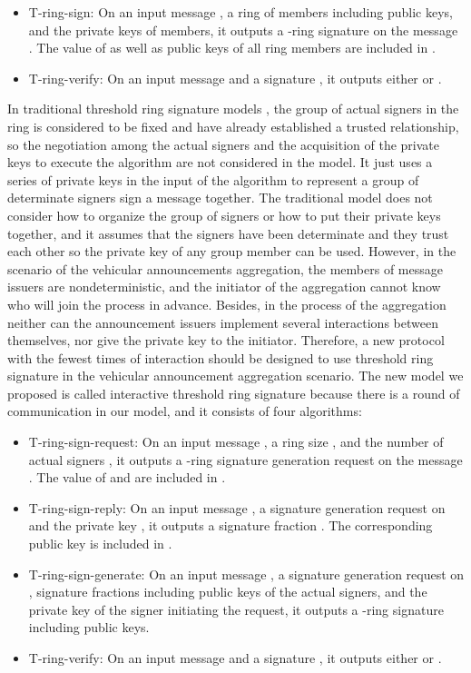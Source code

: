 \documentclass[a4paper]{article}
\begin{document}
\begin{itemize}
 \item T-ring-sign: On an input message , a ring of  members including  public keys, and the private keys of  members, it outputs a -ring signature  on the message . The value of  as well as  public keys of all ring members are included in .
 \item T-ring-verify: On an input message  and a signature , it outputs either  or .
\end{itemize}

In traditional threshold ring signature models \cite{BSS02}\cite{RH13}, the group of actual signers in the ring is considered to be fixed and have already established a trusted relationship, so the negotiation among the actual signers and the acquisition of the private keys to execute the algorithm are not considered in the model. It just uses a series of private keys in the input of the algorithm to represent a group of determinate signers sign a message together. The traditional model does not consider how to organize the group of signers or how to put their private keys together, and it assumes that the signers have been determinate and they trust each other so the private key of any group member can be used. However, in the scenario of the vehicular announcements aggregation, the members of message issuers are nondeterministic, and the initiator of the aggregation cannot know who will join the process in advance. Besides, in the process of the aggregation neither can the announcement issuers implement several interactions between themselves, nor give the private key to the initiator. Therefore, a new protocol with the fewest times of interaction should be designed to use threshold ring signature in the vehicular announcement aggregation scenario. The new model we proposed is called interactive threshold ring signature because there is a round of communication in our model, and it consists of four algorithms:

\begin{itemize}
 \item T-ring-sign-request: On an input message , a ring size , and the number of actual signers , it outputs a -ring signature generation request  on the message . The value of  and  are included in .
 \item T-ring-sign-reply: On an input message , a signature generation request  on  and the private key , it outputs a signature fraction . The corresponding public key  is included in .
 \item T-ring-sign-generate: On an input message , a signature generation request  on ,  signature fractions  including  public keys of the actual signers, and the private key of the signer initiating the request, it outputs a -ring signature  including  public keys.
 \item T-ring-verify: On an input message  and a signature , it outputs either  or .
\end{itemize}
\end{document}
